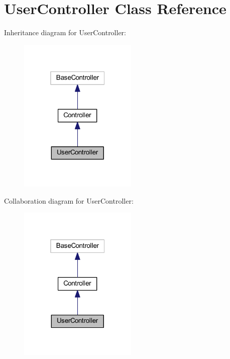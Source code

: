 \hypertarget{class_app_1_1_http_1_1_controllers_1_1_user_controller}{}\section{User\+Controller Class Reference}
\label{class_app_1_1_http_1_1_controllers_1_1_user_controller}


Inheritance diagram for User\+Controller\+:
\nopagebreak
\begin{figure}[H]
\begin{center}
\leavevmode
\includegraphics[width=160pt]{class_app_1_1_http_1_1_controllers_1_1_user_controller__inherit__graph}
\end{center}
\end{figure}


Collaboration diagram for User\+Controller\+:
\nopagebreak
\begin{figure}[H]
\begin{center}
\leavevmode
\includegraphics[width=160pt]{class_app_1_1_http_1_1_controllers_1_1_user_controller__coll__graph}
\end{center}
\end{figure}
